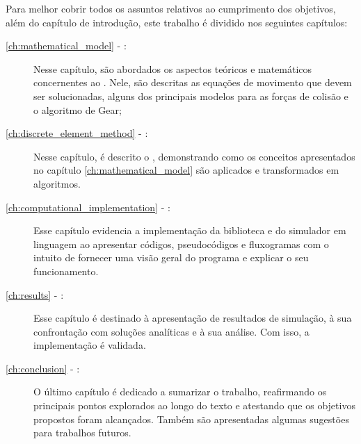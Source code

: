 Para melhor cobrir todos os assuntos relativos ao cumprimento dos objetivos, além do capítulo de introdução, este trabalho é dividido nos seguintes capítulos:
\begin{description}
	\item[\autoref{ch:mathematical_model} - :] Nesse capítulo, são abordados os aspectos teóricos e matemáticos concernentes ao \DEM{}. Nele, são descritas as equações de movimento que devem ser solucionadas, alguns dos principais modelos para as forças de colisão e o algoritmo de Gear;
	\item[\autoref{ch:discrete_element_method} - :] Nesse capítulo, é descrito o \DEM{}, demonstrando como os conceitos apresentados no capítulo \ref{ch:mathematical_model} são aplicados e transformados em algoritmos.
	\item[\autoref{ch:computational_implementation} - :] Esse capítulo evidencia a implementação da biblioteca e do simulador em linguagem \CPP{} ao apresentar códigos, pseudocódigos e fluxogramas com o intuito de fornecer uma visão geral do programa e explicar o seu funcionamento.
	\item[\autoref{ch:results} - :] Esse capítulo é destinado à apresentação de resultados de simulação, à sua confrontação com soluções analíticas e à sua análise. Com isso, a implementação é validada.
	\item[\autoref{ch:conclusion} - :] O último capítulo é dedicado a sumarizar o trabalho, reafirmando os principais pontos explorados ao longo do texto e atestando que os objetivos propostos foram alcançados. Também são apresentadas algumas sugestões para trabalhos futuros.
\end{description}